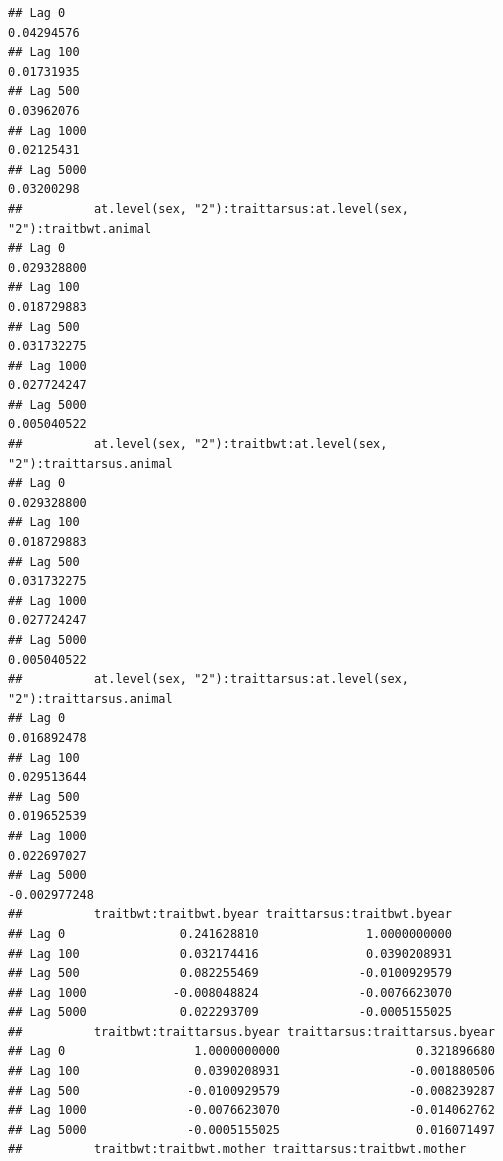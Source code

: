 \documentclass[
  12pt,
]{book}
\begin{document}
\begin{verbatim}
## Lag 0                                                        0.04294576
## Lag 100                                                      0.01731935
## Lag 500                                                      0.03962076
## Lag 1000                                                     0.02125431
## Lag 5000                                                     0.03200298
##          at.level(sex, "2"):traittarsus:at.level(sex, "2"):traitbwt.animal
## Lag 0                                                          0.029328800
## Lag 100                                                        0.018729883
## Lag 500                                                        0.031732275
## Lag 1000                                                       0.027724247
## Lag 5000                                                       0.005040522
##          at.level(sex, "2"):traitbwt:at.level(sex, "2"):traittarsus.animal
## Lag 0                                                          0.029328800
## Lag 100                                                        0.018729883
## Lag 500                                                        0.031732275
## Lag 1000                                                       0.027724247
## Lag 5000                                                       0.005040522
##          at.level(sex, "2"):traittarsus:at.level(sex, "2"):traittarsus.animal
## Lag 0                                                             0.016892478
## Lag 100                                                           0.029513644
## Lag 500                                                           0.019652539
## Lag 1000                                                          0.022697027
## Lag 5000                                                         -0.002977248
##          traitbwt:traitbwt.byear traittarsus:traitbwt.byear
## Lag 0                0.241628810               1.0000000000
## Lag 100              0.032174416               0.0390208931
## Lag 500              0.082255469              -0.0100929579
## Lag 1000            -0.008048824              -0.0076623070
## Lag 5000             0.022293709              -0.0005155025
##          traitbwt:traittarsus.byear traittarsus:traittarsus.byear
## Lag 0                  1.0000000000                   0.321896680
## Lag 100                0.0390208931                  -0.001880506
## Lag 500               -0.0100929579                  -0.008239287
## Lag 1000              -0.0076623070                  -0.014062762
## Lag 5000              -0.0005155025                   0.016071497
##          traitbwt:traitbwt.mother traittarsus:traitbwt.mother

\end{verbatim}
\end{document}
